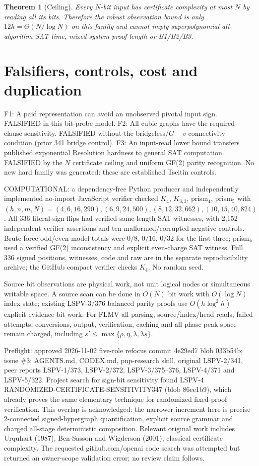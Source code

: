 \documentclass[11pt]{article}
\newtheorem{theorem}{Theorem}
\begin{document}
\begin{theorem}[Ceiling]
Every $N$-bit input has certificate complexity at most $N$ by reading all its bits. Therefore the robust observation bound is only $12h=\Theta(N/\log N)$ on this family and cannot imply superpolynomial all-algorithm SAT time, mixed-system proof length or B1/B2/B3.
\end{theorem}

\section*{Falsifiers, controls, cost and duplication}
F1: A paid representation can avoid an unobserved pivotal input sign. FALSIFIED in this bit-probe model. F2: All cubic graphs have the required clause sensitivity. FALSIFIED without the bridgeless/$G-v$ connectivity condition (prior 341 bridge control). F3: An input-read lower bound transfers published exponential Resolution hardness to general SAT computation. FALSIFIED by the $N$ certificate ceiling and uniform GF(2) parity recognition. No new hard family was generated: these are established Tseitin controls.

COMPUTATIONAL: a dependency-free Python producer and independently implemented no-import JavaScript verifier checked $K_4$, $K_{3,3}$, prism$_4$, prism$_5$ with $(h,n,m,N)=(4,6,16,290),(6,9,24,500),(8,12,32,662),(10,15,40,824)$. All 336 literal-sign flips had verified same-length SAT witnesses, with 2,152 independent verifier assertions and ten malformed/corrupted negative controls. Brute-force odd/even model totals were $0/8$, $0/16$, $0/32$ for the first three; prism$_5$ used a verified GF(2) inconsistency and explicit even-charge SAT witness. Full 336 signed positions, witnesses, code and raw are in the separate reproducibility archive; the GitHub compact verifier checks $K_4$. No random seed.

Source bit observations are physical work, not unit logical nodes or simultaneous writable space. A source scan can be done in $O(N)$ bit work with $O(\log N)$ index state; existing LSPV-3/376 balanced parity proofs use $O(h\log^2h)$ explicit evidence bit work. For FLMV all parsing, source/index/head reads, failed attempts, conversions, output, verification, caching and all-phase peak space remain charged, including $s'\le\max\{\rho,\eta,\lambda,\lambda s\}$.

Preflight: approved 2026-11-02 five-role refocus commit 4e29ed7 blob 033b54b; issue \#3; AGENTS.md, CODEX.md, pnp-research skill, original LSPV-2/341, peer reports LSPV-1/373, LSPV-2/372, LSPV-3/375--376, LSPV-4/371 and LSPV-5/322. Project search for sign-bit sensitivity found LSPV-4 RANDOMIZED-CERTIFICATE-SENSITIVITY347 (blob 86ee1b9), which already proves the same elementary technique for randomized fixed-proof verification. This overlap is acknowledged: the narrower increment here is precise 2-connected signed-hypergraph quantification, explicit source grammar and charged all-stage deterministic composition. Relevant original work includes Urquhart (1987), Ben-Sasson and Wigderson (2001), classical certificate complexity. The requested github.com/openai code search was attempted but returned an owner-scope validation error; no review claim follows.
\end{document}
